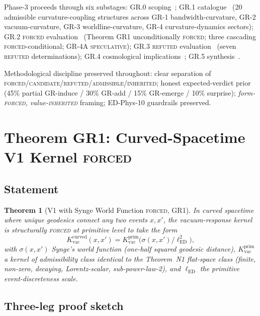 \documentclass[11pt,a4paper]{article}
\newtheorem{theorem}{Theorem}[section]
\begin{document}
Phase-3 proceeds through six substages: GR.0 scoping~\cite{gr0}; GR.1 catalogue~\cite{gr1} (20 admissible curvature-coupling structures across GR-1 bandwidth-curvature, GR-2 vacuum-curvature, GR-3 worldline-curvature, GR-4 curvature-dynamics sectors); GR.2 \textsc{forced} evaluation~\cite{gr2} (Theorem GR1 unconditionally \textsc{forced}; three cascading \textsc{forced}-conditional; GR-4A \textsc{speculative}); GR.3 \textsc{refuted} evaluation~\cite{gr3} (seven \textsc{refuted} determinations); GR.4 cosmological implications~\cite{gr4}; GR.5 synthesis~\cite{gr5}.

Methodological discipline preserved throughout: clear separation of \textsc{forced}/\textsc{candidate}/\textsc{refuted}/\textsc{admissible}/\textsc{inherited}; honest expected-verdict prior (45\% partial GR-induce / 30\% GR-add / 15\% GR-emerge / 10\% surprise); \emph{form-\textsc{forced}, value-\textsc{inherited}} framing; ED-Phys-10 guardrails preserved.

\section{Theorem GR1: Curved-Spacetime V1 Kernel \textsc{forced}}

\subsection{Statement}

\begin{theorem}[V1 with Synge World Function \textsc{forced}, GR1]
In curved spacetime where unique geodesics connect any two events $x, x'$, the vacuum-response kernel is structurally \textsc{forced} at primitive level to take the form
\begin{equation}
K_\mathrm{vac}^\mathrm{curved}(x, x') = K_\mathrm{vac}^\mathrm{prim}\bigl(\sigma(x, x') / \ell_\mathrm{ED}^2\bigr),
\end{equation}
with $\sigma(x, x')$ Synge's world function (one-half squared geodesic distance), $K_\mathrm{vac}^\mathrm{prim}$ a kernel of admissibility class identical to the Theorem~N1 flat-space class (finite, non-zero, decaying, Lorentz-scalar, sub-power-law-2), and $\ell_\mathrm{ED}$ the primitive event-discreteness scale.
\end{theorem}

\subsection{Three-leg proof sketch}
\end{document}

